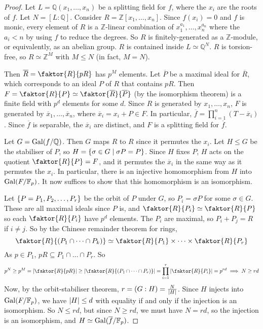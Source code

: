 \begin{proof}
	Let \( L = \mathbb Q(x_1, \dots, x_n) \) be a splitting field for \( f \), where the \( x_i \) are the roots of \( f \).
	Let \( N = [L:\mathbb Q] \).
	Consider \( R = \mathbb Z[x_1, \dots, x_n] \).
	Since \( f(x_i) = 0 \) and \( f \) is monic, every element of \( R \) is a \( \mathbb Z \)-linear combination of \( x_1^{a_1}, \dots, x_n^{a_n} \) where the \( a_i < n \) by using \( f \) to reduce the degrees.
	So \( R \) is finitely-generated as a \( \mathbb Z \)-module, or equivalently, as an abelian group.
	\( R \) is contained inside \( L \simeq \mathbb Q^N \).
	\( R \) is torsion-free, so \( R \simeq \mathbb Z^M \) with \( M \leq N \) (in fact, \( M = N \)).

	Then \( \overline R = \faktor{R}{pR} \) has \( p^M \) elements.
	Let \( \overline P \) be a maximal ideal for \( \overline R \), which corresponds to an ideal \( P \) of \( R \) that contains \( pR \).
	Then \( F = \faktor{R}{P} \simeq \faktor{\overline R}{\overline P} \) (by the isomorphism theorem) is a finite field with \( p^d \) elements for some \( d \).
	Since \( R \) is generated by \( x_1, \dots, x_n \), \( F \) is generated by \( \overline x_1, \dots, \overline x_n \), where \( \overline x_i = x_i + P \in F \).
	In particular, \( \overline f = \prod_{i=1}^n (T - \overline x_i) \).
	Since \( \overline f \) is separable, the \( \overline x_i \) are distinct, and \( F \) is a splitting field for \( \overline f \).

	Let \( G = \operatorname{Gal}(f/\mathbb Q) \).
	Then \( G \) maps \( R \) to \( R \) since it permutes the \( x_i \).
	Let \( H \leq G \) be the stabiliser of \( P \), so \( H = \qty{\sigma \in G \mid \sigma P = P} \).
	Since \( H \) fixes \( P \), \( H \) acts on the quotient \( \faktor{R}{P} = F \), and it permutes the \( \overline x_i \) in the same way as it permutes the \( x_i \).
	In particular, there is an injective homomorphism from \( H \) into \( \operatorname{Gal}(F/\mathbb F_p) \).
	It now suffices to show that this homomorphism is an isomorphism.

	Let \( \qty{P = P_1, P_2, \dots, P_r} \) be the orbit of \( P \) under \( G \), so \( P_i = \sigma P \) for some \( \sigma \in G \).
	These are all maximal ideals since \( P \) is, and \( \faktor{R}{P_i} \simeq \faktor{R}{P} \) so each \( \faktor{R}{P_i} \) have \( p^d \) elements.
	The \( P_i \) are maximal, so \( P_i + P_j = R \) if \( i \neq j \).
	So by the Chinese remainder theorem for rings,
	\[ \faktor{R}{(P_1 \cap \dots \cap P_k)} \simeq \faktor{R}{P_1} \times \dots \times \faktor{R}{P_r} \]
	As \( p \in P_1 \), \( pR \subseteq P_1 \cap \dots \cap P_r \).
	So
	\[ p^N \geq p^M = \abs{\faktor{R}{pR}} \geq \abs{\faktor{R}{(P_1 \cap \dots \cap P_r)}} = \prod_{i=1}^r \abs{\faktor{R}{P_i}} = p^{rd} \implies N \geq rd \]
	Now, by the orbit-stabiliser theorem, \( r = (G : H) = \frac{N}{\abs{H}} \).
	Since \( H \) injects into \( \operatorname{Gal}(F/\mathbb F_p) \), we have \( \abs{H} \leq d \) with equality if and only if the injection is an isomorphism.
	So \( N \leq rd \), but since \( N \geq rd \), we must have \( N = rd \), so the injection is an isomorphism, and \( H \simeq \operatorname{Gal}(\overline f/\mathbb F_p) \).
\end{proof}
